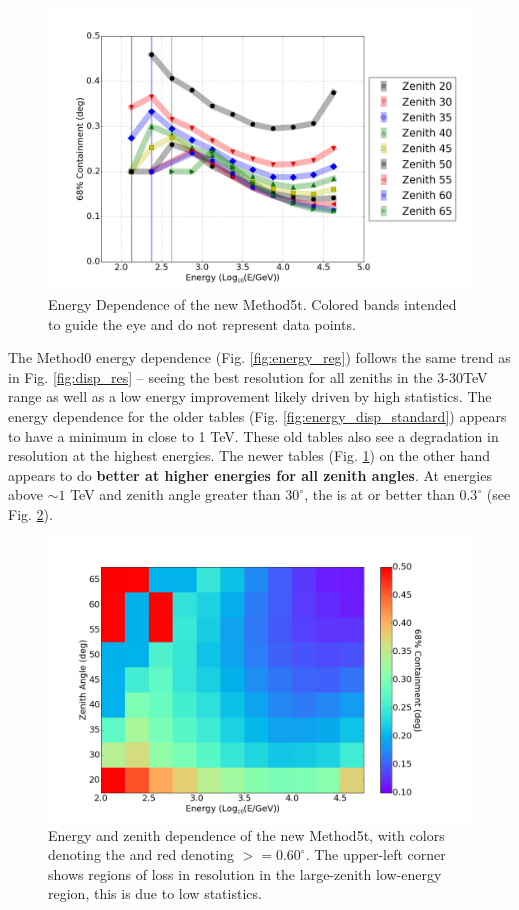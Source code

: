 \documentclass[main.tex]{subfiles}
\begin{document}
\begin{figure}[htbp]
  \centering
  \includegraphics[width=.8\linewidth]{images/disp_450x4size_energy}
  \caption{Energy Dependence of the new Method5t. Colored bands intended to guide the eye and do not represent data points.}
  \label{fig:energy_disp_450}    
\end{figure}

The Method0 energy dependence (Fig. \ref{fig:energy_reg}) follows the same trend as in Fig. \ref{fig:disp_res} -- seeing the best resolution for all zeniths in the 3-30TeV range as well as a low energy improvement likely driven by high statistics. The energy dependence for the older \disp tables (Fig. \ref{fig:energy_disp_standard}) appears to have a minimum in \rse close to 1 TeV. These old \disp tables also see a degradation in resolution at the highest energies. The newer \disp tables (Fig. \ref{fig:energy_disp_450}) on the other hand appears to do {\bf better at higher energies for all zenith angles}. At energies above $\sim 1$ TeV and zenith angle greater than $30^\circ$, the \rse is at or better than $0.3^\circ$ (see Fig. \ref{fig:energy_new_contour}).

\begin{figure}[htbp]
  \centering
  \includegraphics[width=.9\linewidth]{images/disp_450x4size_rse}
  \caption[Energy and zenith dependence of the new Method5t.]{Energy and zenith dependence of the new Method5t, with colors denoting the \rse and red denoting \rse$>=0.60^\circ$. The upper-left corner shows regions of loss in resolution in the large-zenith low-energy region, this is due to low statistics.}
  \label{fig:energy_new_contour}
\end{figure}
\end{document}
